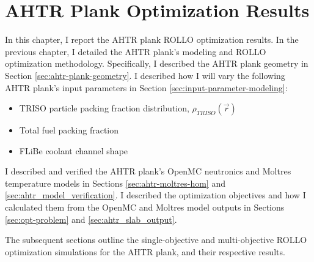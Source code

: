 \chapter{AHTR Plank Optimization Results}
\label{chap:ahtr-plank-opt-results}
In this chapter, I report the \gls{AHTR} plank \gls{ROLLO} optimization results. 
In the previous chapter, I detailed the \gls{AHTR} plank's modeling and \gls{ROLLO} 
optimization methodology. 
Specifically, I described the \gls{AHTR} plank geometry in Section 
\ref{sec:ahtr-plank-geometry}.
I described how I will vary the following \gls{AHTR} plank's input parameters in Section
\ref{sec:input-parameter-modeling}:  
\begin{itemize}
    \item \gls{TRISO} particle packing fraction distribution, 
    $\rho_{TRISO}(\vec{r})$
    \item Total fuel packing fraction
    \item \gls{FLiBe} coolant channel shape 
\end{itemize} 
I described and verified the \gls{AHTR} plank's OpenMC neutronics and Moltres 
temperature models in Sections \ref{sec:ahtr-moltres-hom} and 
\ref{sec:ahtr_model_verification}. 
I described the optimization objectives and how I calculated them from the OpenMC 
and Moltres model outputs in Sections \ref{sec:opt-problem} and 
\ref{sec:ahtr_slab_output}.

The subsequent sections outline the single-objective and multi-objective 
ROLLO optimization simulations for the \gls{AHTR} plank, and their respective results. 

